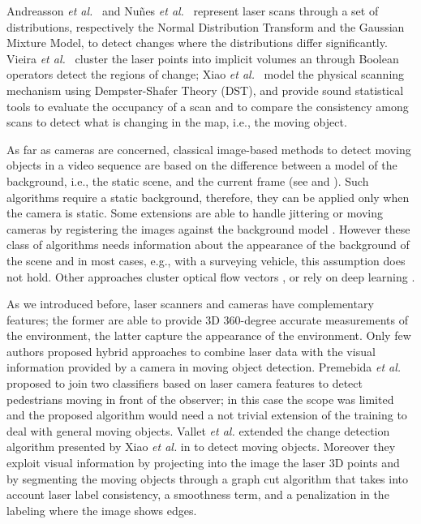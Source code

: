 Andreasson \emph{et al.}~\cite{andreasson2007has} and Nu{\~n}es \emph{et al.}~\cite{nunez2010change} represent laser scans through a set of distributions, respectively the Normal Distribution Transform and the Gaussian Mixture Model, to detect changes where the distributions differ significantly. 
Vieira \emph{et al.}~\cite{vieira2014spatial} cluster the laser points into implicit volumes an through Boolean operators detect the regions of change;
Xiao \emph{et al.}~\cite{xiao2013change} model the physical scanning mechanism using Dempster-Shafer Theory (DST), and provide sound statistical tools to evaluate the occupancy of a scan and to compare the consistency among scans to detect what is changing in the map, i.e., the moving object. %

As far as cameras are concerned, classical image-based methods to detect moving objects in a video sequence are based on the difference between a model of the background, i.e., the static scene, and the current frame (see \cite{Piccardi2004background} and \cite{Sobral2014}). 
Such algorithms require a static background, therefore, they can be applied only when the camera is static. 
Some extensions are able to handle jittering or moving cameras by registering the images against the background model \cite{azzari2005effective,Andrea,kim2013detection,shakeri2014detection}.
However these class of algorithms needs information about the appearance of the background of the scene and in most cases, e.g., with a surveying vehicle, this assumption does not hold. 
Other approaches cluster optical flow vectors \cite{markovic2014moving}, or rely on deep learning \cite{lin2014deep}.

As we introduced before, laser scanners and cameras have complementary features; the former are able to provide 3D 360-degree accurate measurements of the environment, the latter capture the appearance of the environment. Only few authors proposed hybrid approaches to combine laser data with the visual information provided by a camera in moving object detection.
Premebida \emph{et al.} \cite{premebida2009lidar} proposed to join two classifiers based on laser camera features to detect pedestrians moving in front of the observer; in this case the scope was limited and the proposed algorithm would need a not trivial extension of the training to deal with general moving objects.
Vallet \emph{et al.} \cite{vallet2015extracting} extended the change detection algorithm presented by Xiao \emph{et al.} in \cite{xiao2013change} to detect moving objects. Moreover they exploit visual information by projecting into the image the laser 3D points and by segmenting the moving objects through a graph cut algorithm that takes into account laser label consistency, a smoothness term, and a penalization in the labeling where the image shows edges. 

